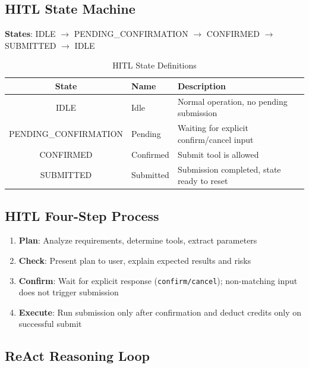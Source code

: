 \subsection{HITL State Machine}

\textbf{States}: IDLE $\rightarrow$ PENDING\_CONFIRMATION $\rightarrow$ CONFIRMED $\rightarrow$ SUBMITTED $\rightarrow$ IDLE

\begin{table}[H]
	\centering
	\caption{HITL State Definitions}
	\begin{tabular}{@{}clp{6cm}@{}}
		\toprule
		\textbf{State} & \textbf{Name} & \textbf{Description} \\
		\midrule
		IDLE & Idle & Normal operation, no pending submission \\
		PENDING\_CONFIRMATION & Pending & Waiting for explicit confirm/cancel input \\
		CONFIRMED & Confirmed & Submit tool is allowed \\
		SUBMITTED & Submitted & Submission completed, state ready to reset \\
		\bottomrule
	\end{tabular}
\end{table}

\subsection{HITL Four-Step Process}

\begin{enumerate}
	\item \textbf{Plan}: Analyze requirements, determine tools, extract parameters
	\item \textbf{Check}: Present plan to user, explain expected results and risks
	\item \textbf{Confirm}: Wait for explicit response (\texttt{confirm/cancel}); non-matching input does not trigger submission
	\item \textbf{Execute}: Run submission only after confirmation and deduct credits only on successful submit
\end{enumerate}

\subsection{ReAct Reasoning Loop}

